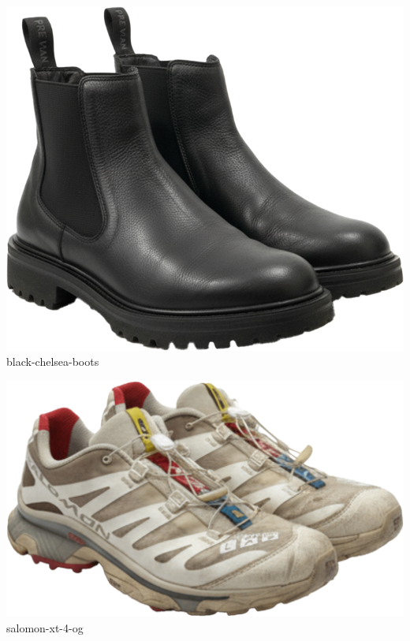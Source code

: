 \documentclass[10pt]{article}
\begin{document}
\begin{minipage}[t]{0.22\textwidth}\centering\vspace{0mm}
\includegraphics[width=\linewidth,keepaspectratio]{assets/shoes/black-chelsea-boots.png}\\
\vspace{0.5mm}\tiny black-chelsea-boots\end{minipage}
\begin{minipage}[t]{0.22\textwidth}\centering\vspace{0mm}
\includegraphics[width=\linewidth,keepaspectratio]{assets/shoes/salomon-xt-4-og.png}\\
\vspace{0.5mm}\tiny salomon-xt-4-og\end{minipage}
\newpage
\end{document}
